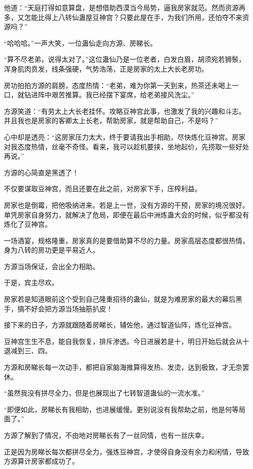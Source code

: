 \begin{this_body}
他道：“天庭打得如意算盘，是想借助西漠当今局势，逼我房家就范。然而资源再多，又怎能比得上八转仙蛊屋豆神宫？只要此屋在手，为我们所用，还怕夺不来资源吗？”

“哈哈哈。”一声大笑，一位蛊仙走向方源、房睇长。

“算不尽老弟，说得太对了。”这位蛊仙乃是一位老者，白发白眉，胡须宛若狮鬃，浑身肌肉贲发，线条强硬，气势浩荡，正是房家的太上大长老房功。

房功拍拍方源的肩膀，态度热情：“老弟，难为你第一天到来，热茶还未喝上一口，就钻进阵中艰苦推算。我已经摆下宴席，给老弟接风洗尘。”

方源笑道：“有劳太上大长老挂怀。攻略豆神宫此事，也激发了我的兴趣和斗志。并且我也是房家的客卿太上长老，帮助房家，就是帮助自己，不是吗？”

心中却是透亮：“这房家压力太大，终于要请我出手相助，尽快炼化豆神宫。房家对我态度热情，丝毫不奇怪。看来，我可以趁机要挟，坐地起价，先捞取一些好处再说。”

方源的心简直是黑透了！

不仅要谋取豆神宫，而且还要在此之前，对房家下手，压榨利益。

房家也是倒霉，把他吸纳进来。若是上一世，没有方源的干预，房家的境况很好。单凭房家自身努力，就解决了危局，即便在最后中洲炼蛊大会的时候，似乎都没有炼化了豆神宫。

一场酒宴，规格隆重，房家真的是要借助算不尽的力量。房家高层态度都很热情，身为八转的房功更是平易近人。

方源当场保证，会出全力相助。

于是，宾主尽欢。

房家若是知道眼前这个受到自己隆重招待的蛊仙，就是为难房家的最大的幕后黑手，搞不好会把方源当场抽筋扒皮！

接下来的日子，方源就跟随着房睇长，辅佐他，通过智道仙阵，炼化豆神宫。

豆神宫生生不息，能自我恢复，排斥渗透。今日进展若是十，明日开始后就会从十退减到三、四。

方源和房睇长每一次动手，都把自家脑海推算得发热、发烫，达到极致，才无奈罢休。

“虽然我没有拼尽全力，但是也展现出了七转智道蛊仙的一流水准。”

“即便如此，房睇长有我相助，也进展缓慢。更别说没有我帮助之前，他是何等局面了。”

方源了解到了情况，不由地对房睇长有了一丝同情，也有一丝庆幸。

正是因为房睇长每次都拼尽全力，强炼豆神宫，才使得自身没有余力和闲情，导致方源算计房家都成功了。


\end{this_body}
